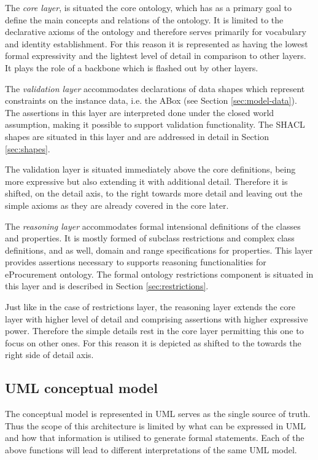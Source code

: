 	The \textit{core layer}, is situated the core ontology, which has as a primary goal to define the main concepts and relations of the ontology. It is limited to the declarative axioms of the ontology and therefore serves primarily for vocabulary and identity establishment. For this reason it is represented as having the lowest formal expressivity and the lightest level of detail in comparison to other layers. It plays the role of a backbone which is flashed out by other layers. 

	The \textit{validation layer} accommodates declarations of data shapes which represent constraints on the instance data, i.e. the ABox (see Section \ref{sec:model-data}). The assertions in this layer are interpreted done under the closed world assumption, making it possible to support validation functionality. The SHACL shapes are situated in this layer and are addressed in detail in Section \ref{sec:shapes}.
	
	The validation layer is situated immediately above the core definitions, being more expressive but also extending it with additional detail. Therefore it is shifted, on the detail axis, to the right towards more detail and leaving out the simple axioms as they are already covered in the core later.
	
	The \textit{reasoning layer} accommodates formal intensional definitions of the classes and properties. It is mostly formed of subclass restrictions and complex class definitions, and as well, domain and range specifications for properties. This layer provides assertions necessary to supports reasoning functionalities for eProcurement ontology. The formal ontology restrictions component is situated in this layer and is described in Section \ref{sec:restrictions}.
	
	Just like in the case of restrictions layer, the reasoning layer extends the core layer with higher level of detail and comprising assertions with higher expressive power. Therefore the simple details rest in the core layer permitting this one to focus on other ones. For this reason it is depicted as shifted to the towards the right side of detail axis.
	
	
	\subsection{UML conceptual model}
	\label{sec:uml-model}	
	
	The conceptual model is represented in UML \citep{uml-userguide} serves as the single source of truth. Thus the scope of this architecture is limited by what can be expressed in UML and how that information is utilised to generate formal statements. Each of the above functions will lead to different interpretations of the same UML model.
	
